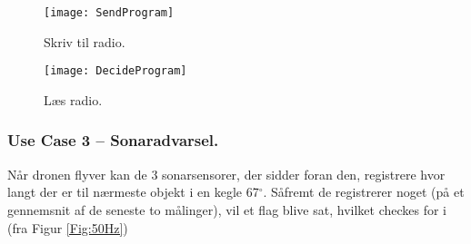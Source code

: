 \documentclass[Main]{subfiles}
\begin{document}
\begin{figure}[H]
\centering
\texttt{[image: SendProgram]}
\caption{Skriv til radio.}
\label{Fig:SendProgram}
\end{figure}


\begin{figure}[H]
\centering
\texttt{[image: DecideProgram]}
\caption{Læs radio.}
\label{Fig:DecideProgram}
\end{figure}


\newpage
\subsubsection{Use Case 3 -- Sonaradvarsel.}
Når dronen flyver kan de 3 sonarsensorer, der sidder foran den, registrere hvor langt der er til nærmeste objekt i en kegle 67$^{\circ}$.
Såfremt de registrerer noget (på et gennemsnit af de seneste to målinger), vil et flag blive sat, hvilket checkes for i  (fra Figur \ref{Fig:50Hz})
\end{document}
